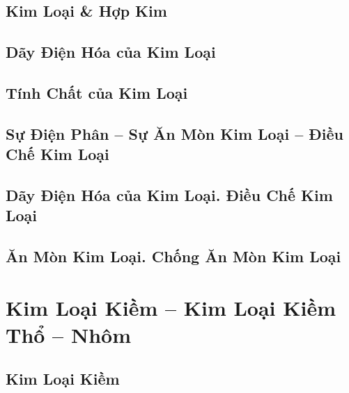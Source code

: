 \documentclass{article}
\numberwithin{equation}{section}
\begin{document}
\subsection{Kim Loại \& Hợp Kim}


\subsection{Dãy Điện Hóa của Kim Loại}


\subsection{Tính Chất của Kim Loại}


\subsection{Sự Điện Phân -- Sự Ăn Mòn Kim Loại -- Điều Chế Kim Loại}


\subsection{Dãy Điện Hóa của Kim Loại. Điều Chế Kim Loại}


\subsection{Ăn Mòn Kim Loại. Chống Ăn Mòn Kim Loại}


\section{Kim Loại Kiềm -- Kim Loại Kiềm Thổ -- Nhôm}

\subsection{Kim Loại Kiềm}
\end{document}
